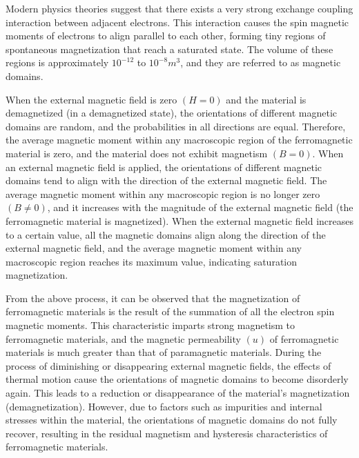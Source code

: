 \documentclass[UTF8]{article}
\begin{document}
      Modern physics theories suggest that there exists a very strong exchange coupling interaction between adjacent electrons. This interaction causes the spin magnetic moments of electrons to align parallel to each other, forming tiny regions of spontaneous magnetization that reach a saturated state. The volume of these regions is approximately $10^{-12}$ to $10^{-8} m^3$, and they are referred to as magnetic domains. 
      
      When the external magnetic field is zero $(H=0)$ and the material is demagnetized (in a demagnetized state), the orientations of different magnetic domains are random, and the probabilities in all directions are equal. Therefore, the average magnetic moment within any macroscopic region of the ferromagnetic material is zero, and the material does not exhibit magnetism $(B=0)$. When an external magnetic field is applied, the orientations of different magnetic domains tend to align with the direction of the external magnetic field. The average magnetic moment within any macroscopic region is no longer zero $(B\ne 0)$, and it increases with the magnitude of the external magnetic field (the ferromagnetic material is magnetized). When the external magnetic field increases to a certain value, all the magnetic domains align along the direction of the external magnetic field, and the average magnetic moment within any macroscopic region reaches its maximum value, indicating saturation magnetization. 
      
      From the above process, it can be observed that the magnetization of ferromagnetic materials is the result of the summation of all the electron spin magnetic moments. This characteristic imparts strong magnetism to ferromagnetic materials, and the magnetic permeability $(u)$ of ferromagnetic materials is much greater than that of paramagnetic materials. During the process of diminishing or disappearing external magnetic fields, the effects of thermal motion cause the orientations of magnetic domains to become disorderly again. This leads to a reduction or disappearance of the material's magnetization (demagnetization). However, due to factors such as impurities and internal stresses within the material, the orientations of magnetic domains do not fully recover, resulting in the residual magnetism and hysteresis characteristics of ferromagnetic materials.
      
\end{document}
